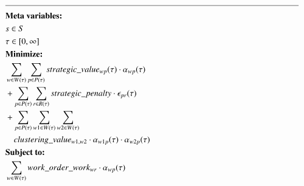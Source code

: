 \begin{alignat}{2}
	& \text{\rule{\linewidth}{0.4pt}} \notag\\
	& \textbf{Meta variables:} \notag\\
	& \ElementScheduler \in \SetScheduler \notag\\
	& \tau \in [0, \infty] \notag\\
	& \textbf{Minimize:} \notag                                                                                                                                                                                                                                                                                \\
	& \sum_{\ElementWorkOrder \in \SetWorkOrder{}} \sum_{\ElementPeriod \in \SetPeriod} \ParStrategicValue \cdot \VarStrategicWorkOrderAssignment{\ElementWorkOrder}{\ElementPeriod}                                                                                                                           \\ 
	& + \sum_{\ElementPeriod \in \SetPeriod} \sum_{\ElementResource \in \SetResource} \ParStrategicPenalty \cdot \VarStrategicExcess                                                                                                                                                                           \\
	& + \sum_{\ElementPeriod \in \SetPeriod} \sum_{\ElementWorkOrder1 \in \SetWorkOrder{}} \sum_{\ElementWorkOrder2 \in \SetWorkOrder{}} \notag                                                                                                                                                                \\ 
	& \quad \ParClusteringValue \cdot \VarStrategicWorkOrderAssignment{\ElementWorkOrder1}{\ElementPeriod} \cdot \VarStrategicWorkOrderAssignment{\ElementWorkOrder2}{\ElementPeriod}                                                                                 \label{eqn:objective_function_strategic} \\
	& \textbf{Subject to:} \notag                                                                                                                                                                                                                                                                              \\
	& \sum_{\ElementWorkOrder \in \SetWorkOrder{}} \ParStrategicWorkOrderWeight \cdot \VarStrategicWorkOrderAssignment{\ElementWorkOrder}{\ElementPeriod} \notag                                                                                                                                               \\ 

\end{alignat}

